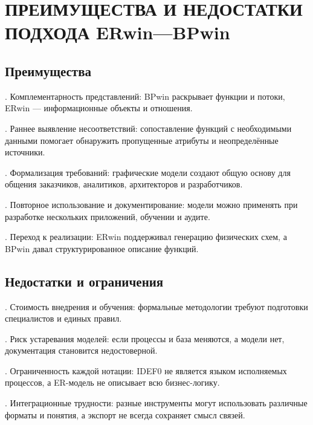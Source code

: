 \documentclass[essaypaper,paper]{pmk-graduate}
\begin{document}
\par

\chapter{ПРЕИМУЩЕСТВА И НЕДОСТАТКИ ПОДХОДА ERwin—BPwin}

\section{Преимущества}

. Комплементарность представлений: BPwin раскрывает функции и потоки, ERwin — информационные объекты и отношения.\par

. Раннее выявление несоответствий: сопоставление функций с необходимыми данными помогает обнаружить пропущенные атрибуты и неопределённые источники.\par

. Формализация требований: графические модели создают общую основу для общения заказчиков, аналитиков, архитекторов и разработчиков.\par

. Повторное использование и документирование: модели можно применять при разработке нескольких приложений, обучении и аудите.\par

. Переход к реализации: ERwin поддерживал генерацию физических схем, а BPwin давал структурированное описание функций.\par

\section{Недостатки и ограничения}

. Стоимость внедрения и обучения: формальные методологии требуют подготовки специалистов и единых правил.\par

. Риск устаревания моделей: если процессы и база меняются, а модели нет, документация становится недостоверной.\par

. Ограниченность каждой нотации: IDEF0 не является языком исполняемых процессов, а ER-модель не описывает всю бизнес-логику.\par

. Интеграционные трудности: разные инструменты могут использовать различные форматы и понятия, а экспорт не всегда сохраняет смысл связей.\par
\end{document}

